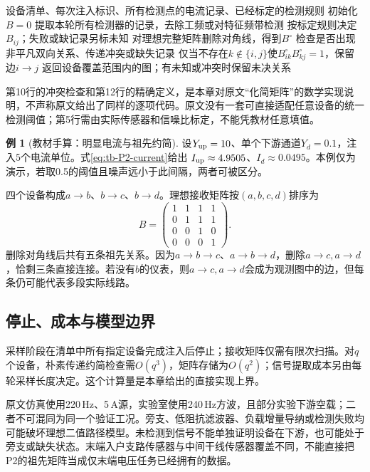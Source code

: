 \documentclass[UTF8,11pt,fontset=fandol,openany,oneside]{ctexbook}
\theoremstyle{definition}
\newtheorem{example}[theorem]{例}
\theoremstyle{remark}
\numberwithin{equation}{chapter}
\begin{document}
\begin{algorithm}[htbp]
\caption{P2原文流程与教材化的传递约简}
\label{alg:tb-P2}
\begin{algorithmic}[1]
\Require 设备清单、每次注入标识、所有检测点的电流记录、已经标定的检测规则
\State 初始化$B=0$
 \State 提取本轮所有检测器的记录，去除工频或对特征频带检测
  \State 按标定规则决定$B_{ij}$；失败或缺记录另标未知
 \EndFor
\EndFor
\State 对理想完整矩阵删除对角线，得到$B^\circ$
\State 检查是否出现非平凡双向关系、传递冲突或缺失记录
 \State 仅当不存在$k\notin\{i,j\}$使$B^\circ_{ik}B^\circ_{kj}=1$，保留边$i\to j$
\EndFor
\State 返回设备覆盖范围内的图；有未知或冲突时保留未决关系
\end{algorithmic}
\end{algorithm}
第10行的冲突检查和第12行的精确定义，是本章对原文“化简矩阵”的数学实现说明，不声称原文给出了同样的逐项代码。原文没有一套可直接适配任意设备的统一检测阈值；第5行需由实际传感器和信噪比标定，不能凭教材任意填值。

\begin{example}[教材手算：明显电流与祖先约简]
设$Y_{\rm up}=10$、单个下游通道$Y_d=0.1$，注入$5$个电流单位。式\eqref{eq:tb-P2-current}给出
$I_{\rm up}\approx4.9505$、$I_d\approx0.0495$。本例仅为演示，若取0.5的阈值且噪声远小于此间隔，两者可被区分。

四个设备构成$a\to b$、$b\to c$、$b\to d$。理想接收矩阵按$(a,b,c,d)$排序为
\[
 B=\begin{pmatrix}
 1&1&1&1\\0&1&1&1\\0&0&1&0\\0&0&0&1
 \end{pmatrix}.
\]
删除对角线后共有五条祖先关系。因为$a\to b\to c$、$a\to b\to d$，删除$a\to c,a\to d$，恰剩三条直接连接。若没有$b$的仪表，则$a\to c,a\to d$会成为观测图中的边，但每条仍可能代表多段实际线路。
\end{example}

\subsection{停止、成本与模型边界}

采样阶段在清单中所有指定设备完成注入后停止；接收矩阵仅需有限次扫描。对$q$个设备，朴素传递约简检查需$O(q^3)$，矩阵存储为$O(q^2)$；信号提取成本另由每轮采样长度决定。这个计算量是本章给出的直接实现上界。

原文仿真使用220\,Hz、5\,A源，实验室使用240\,Hz方波，且部分实验下游空载；二者不可混同为同一个验证工况。旁支、低阻抗滤波器、负载增量导纳或检测失败均可能破坏理想二值路径模型。未检测到信号不能单独证明设备在下游，也可能处于旁支或缺失状态。末端入户支路传感器与中间干线传感器覆盖不同，不能直接把P2的祖先矩阵当成仅末端电压任务已经拥有的数据。
\end{document}
